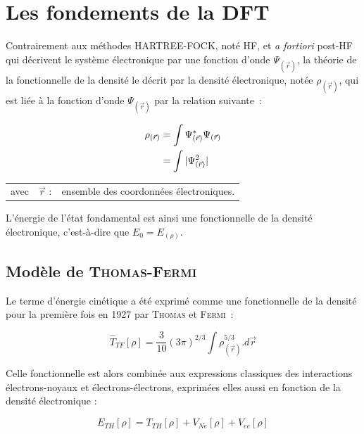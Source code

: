 \newpage

\section{Les fondements de la DFT}

Contrairement aux méthodes HARTREE-FOCK, noté HF, et \textit{a fortiori} post-HF qui décrivent le système électronique par une fonction d'onde $\Psi_{(\vec{r})}$, la théorie de la fonctionnelle de la densité le décrit par la densité électronique, notée $\rho_{(\vec{r})}$, qui est liée à la fonction d'onde $\Psi_{(\vec{r})}$ par la relation suivante~:

\begin{align}
\rho_{(\vec{r})} &= \int \Psi_{(\vec{r})}^{*} \Psi_{(\vec{r})} \\
&= \int |\Psi_{(\vec{r})}^{2}| \notag
\end{align}

\begin{flushleft}
\begin{tabular}{@{}lrp{10cm}}
avec & $\vec{r}$ : & ensemble des coordonnées électroniques. 
\end{tabular}
\end{flushleft}


L'énergie de l'état fondamental est ainsi une fonctionnelle de la densité électronique, c'est-à-dire que $E_{0} = E_{(\rho)}$.

\subsection{Modèle de \textsc{Thomas-Fermi}}

Le terme d'énergie cinétique a été exprimé comme une fonctionnelle de la densité pour la première fois en 1927 par \textsc{Thomas} et \textsc{Fermi}~:

\begin{equation}
\hat{T}_{TF}[\rho] = \frac{3}{10} (3\pi)^{2/3} \int \rho_{(\vec{r})}^{5/3} .d\vec{r}
\label{ener_cin_thom_ferm}
\end{equation}

Celle fonctionnelle est alors combinée aux expressions classiques des interactions électrons-noyaux et électrons-électrons, exprimées elles aussi en fonction de la densité électronique :

\begin{equation}
E_{TH}[\rho] = T_{TH}[\rho] + V_{Ne}[\rho] + V_{ee}[\rho]
\end{equation}

